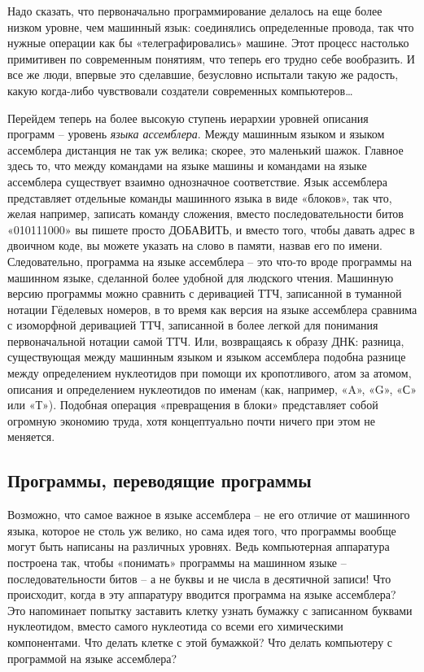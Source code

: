 \documentclass[../main.tex]{subfiles}
\begin{document}
Надо сказать, что первоначально программирование делалось на еще более низком уровне, чем машинный язык: соединялись определенные провода, так что нужные операции как бы «телеграфировались» машине. Этот процесс настолько примитивен по современным понятиям, что теперь его трудно себе вообразить. И все же люди, впервые это сделавшие, безусловно испытали такую же радость, какую когда-либо чувствовали создатели современных компьютеров\ldots{}

Перейдем теперь на более высокую ступень иерархии уровней описания программ \--- уровень \emph{языка ассемблера}. Между машинным языком и языком ассемблера дистанция не так уж велика; скорее, это маленький шажок. Главное здесь то, что между командами на языке машины и командами на языке ассемблера существует взаимно однозначное соответствие. Язык ассемблера представляет отдельные команды машинного языка в виде «блоков», так что, желая например, записать команду сложения, вместо последовательности битов «010111000» вы пишете просто ДОБАВИТЬ, и вместо того, чтобы давать адрес в двоичном коде, вы можете указать на слово в памяти, назвав его по имени. Следовательно, программа на языке ассемблера \--- это что-то вроде программы на машинном языке, сделанной более удобной для людского чтения. Машинную версию программы можно сравнить с деривацией ТТЧ, записанной в туманной нотации Гёделевых номеров, в то время как версия на языке ассемблера сравнима с изоморфной деривацией ТТЧ, записанной в более легкой для понимания первоначальной нотации самой ТТЧ. Или, возвращаясь к образу ДНК: разница, существующая между машинным языком и языком ассемблера подобна разнице между определением нуклеотидов при помощи их кропотливого, атом за атомом, описания и определением нуклеотидов по именам (как, например, «A», «G», «С» или «Т»). Подобная операция «превращения в блоки» представляет собой огромную экономию труда, хотя концептуально почти ничего при этом не меняется.


\subsection{Программы, переводящие программы}

Возможно, что самое важное в языке ассемблера \--- не его отличие от машинного языка, которое не столь уж велико, но сама идея того, что программы вообще могут быть написаны на различных уровнях. Ведь компьютерная аппаратура построена так, чтобы «понимать» программы на машинном языке \--- последовательности битов \--- а не буквы и не числа в десятичной записи! Что происходит, когда в эту аппаратуру вводится программа на языке ассемблера? Это напоминает попытку заставить клетку узнать бумажку с записанном буквами нуклеотидом, вместо самого нуклеотида со всеми его химическими компонентами. Что делать клетке с этой бумажкой? Что делать компьютеру с программой на языке ассемблера?
\end{document}
